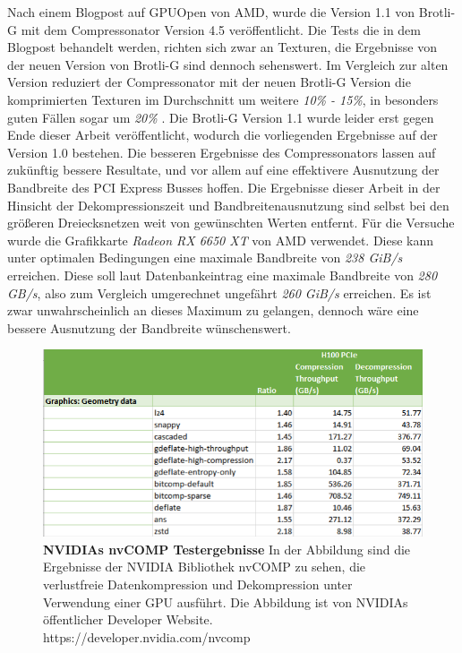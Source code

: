 Nach einem Blogpost auf GPUOpen von AMD, wurde die Version 1.1 von Brotli-G mit dem Compressonator Version 4.5 veröffentlicht.
Die Tests die in dem Blogpost behandelt werden, richten sich zwar an Texturen, die Ergebnisse von der neuen Version von Brotli-G sind dennoch sehenswert.
Im Vergleich zur alten Version reduziert der Compressonator mit der neuen Brotli-G Version die komprimierten Texturen im Durchschnitt um weitere \textit{10\% - 15\%}, in besonders guten Fällen sogar um \textit{20\%} \cite{Levesque2024}.
Die Brotli-G Version 1.1 wurde leider erst gegen Ende dieser Arbeit veröffentlicht, wodurch die vorliegenden Ergebnisse auf der Version 1.0 bestehen.
Die besseren Ergebnisse des Compressonators lassen auf zukünftig bessere Resultate, und vor allem auf eine effektivere Ausnutzung der Bandbreite des PCI Express Busses hoffen.
Die Ergebnisse dieser Arbeit in der Hinsicht der Dekompressionszeit und Bandbreitenausnutzung sind selbst bei den größeren Dreiecksnetzen weit von gewünschten Werten entfernt.
Für die Versuche wurde die Grafikkarte \textit{Radeon RX 6650 XT} von AMD verwendet.
Diese kann unter optimalen Bedingungen eine maximale Bandbreite von \textit{238 GiB/s} erreichen.
Diese soll laut Datenbankeintrag eine maximale Bandbreite von \textit{280 GB/s}, also zum Vergleich umgerechnet ungefährt \textit{260 GiB/s} erreichen.
Es ist zwar unwahrscheinlich an dieses Maximum zu gelangen, dennoch wäre eine bessere Ausnutzung der Bandbreite wünschenswert. \newpage
\begin{figure}[htb]
  \centering  
  \includegraphics[scale=0.70]{Bilder/nvComp_geometry_results.png}
  \caption[NVIDIAs nvCOMP Testergebnisse]{\textbf{NVIDIAs nvCOMP Testergebnisse} In der Abbildung sind die Ergebnisse der NVIDIA Bibliothek nvCOMP zu sehen, die verlustfreie Datenkompression und Dekompression unter Verwendung einer GPU ausführt.
  Die Abbildung ist von NVIDIAs öffentlicher Developer Website. https://developer.nvidia.com/nvcomp }
  \label{fig:nvCOMP}
\end{figure}

